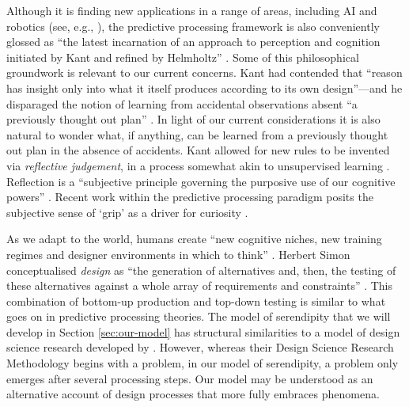 Although it is finding new applications in a range of areas, including AI and robotics (see, e.g., \citet{DBLP:journals/corr/McGregorBB15,10.3389/frobt.2018.00021,thornton2017predictive}), the predictive processing framework is also conveniently glossed as ``the latest incarnation of an approach to perception and cognition initiated by Kant and refined by Helmholtz'' \cite{swanson2016predictive}.  Some of this philosophical groundwork is relevant to our current concerns.  Kant had contended that ``reason has insight only into what it itself produces according to its own design''---and he disparaged the notion of learning from accidental observations absent ``a previously thought out plan'' \cite[p.~20]{kant1929critique}.  In light of our current considerations it is also natural to wonder what, if anything, can be learned from a previously thought out plan in the absence of accidents.  Kant allowed for new rules to be invented via \emph{reflective judgement}, in a process somewhat akin to unsupervised learning \cite[p.~265]{kant1987critique}.  Reflection is a ``subjective principle governing the purposive use of our cognitive powers'' \cite[p.~266]{kant1987critique}.  Recent work within the predictive processing paradigm posits the subjective sense of `grip' as a driver for curiosity \cite{Kiverstein2017}.

As we adapt to the world, humans create ``new cognitive niches, new
training regimes and designer environments in which to
think'' \cite[p.~265]{pittphilsci10470}.  Herbert Simon
conceptualised \emph{design} as ``the generation of alternatives and,
then, the testing of these alternatives against a whole array of
requirements and
constraints'' \cite[pp.~128--129]{simon1996sciences}. This combination
of bottom-up production and top-down testing is similar to what goes
on in predictive processing theories.  The model of serendipity that
we will develop in Section \ref{sec:our-model} has structural
similarities to a model of design science research developed
by \citet{Peffers:2007:DSR:1481765.1481768}.  However, whereas their
Design Science Research Methodology begins with a problem, in our
model of serendipity, a problem only emerges after several processing
steps.  Our model may be understood as an alternative account of
design processes that more fully embraces phenomena.

